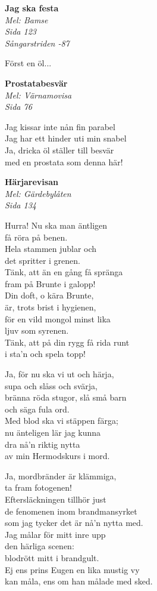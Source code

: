 \documentclass[10pt]{article}
\newenvironment{song}[2]{
	\textbf{#1}\\
	\emph{#2}\par
	\vspace{-1mm}
}{
	\vspace{2mm}
}
\begin{document}
\begin{multicols*}{2}
\begin{song}{Jag ska festa}{Mel: Bamse\\Sida 123\\Sångarstriden -87}
	Först en öl...
\end{song}

\vfill
\columnbreak

\begin{song}{Prostatabesvär}{Mel: Värnamovisa\\Sida 76}
	Jag kissar inte nån fin parabel\\
	Jag har ett hinder uti min snabel\\
	Ja, dricka öl ställer till besvär\\
	med en prostata som denna här!
\end{song}

\begin{song}{Härjarevisan}{Mel: Gärdebylåten\\Sida 134}
	Hurra! Nu ska man äntligen\\
	få röra på benen.\\
	Hela stammen jublar och\\
	det spritter i grenen.\\
	Tänk, att än en gång få spränga\\
	fram på Brunte i galopp!\\
	Din doft, o kära Brunte,\\
	är, trots brist i hygienen,\\
	för en vild mongol minst lika\\
	ljuv som syrenen.\\
	Tänk, att på din rygg få rida runt\\
	i sta'n och spela topp!

	Ja, för nu ska vi ut och härja,\\
	supa och slåss och svärja,\\
	bränna röda stugor, slå små barn\\
	och säga fula ord.\\
	Med blod ska vi stäppen färga;\\
	nu änteligen lär jag kunna\\
	dra nå'n riktig nytta\\
	av min Hermodskurs i mord.

	Ja, mordbränder är klämmiga,\\
	ta fram fotogenen!\\
	Eftersläckningen tillhör just\\
	de fenomenen inom brandmansyrket\\
	som jag tycker det är nå'n nytta med.\\
	Jag målar för mitt inre upp\\
	den härliga scenen:\\
	blodrött mitt i brandgult.\\
	Ej ens prins Eugen en lika mustig vy\\
	kan måla, ens om han målade med sked.


\end{song}
\end{multicols*}
\end{document}
